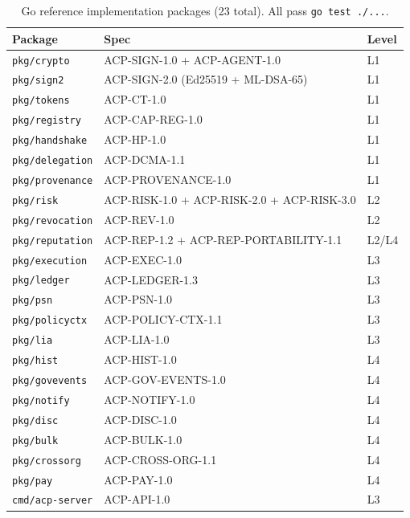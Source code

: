 \documentclass[11pt]{article}
\theoremstyle{definition}
\begin{document}
\begin{table}[h!]
\centering
\small
\begin{tabular}{@{}lll@{}}
\toprule
\textbf{Package} & \textbf{Spec} & \textbf{Level} \\
\midrule
\texttt{pkg/crypto} & ACP-SIGN-1.0 + ACP-AGENT-1.0 & L1 \\
\texttt{pkg/sign2} & ACP-SIGN-2.0 (Ed25519 + ML-DSA-65) & L1 \\
\texttt{pkg/tokens} & ACP-CT-1.0 & L1 \\
\texttt{pkg/registry} & ACP-CAP-REG-1.0 & L1 \\
\texttt{pkg/handshake} & ACP-HP-1.0 & L1 \\
\texttt{pkg/delegation} & ACP-DCMA-1.1 & L1 \\
\texttt{pkg/provenance} & ACP-PROVENANCE-1.0 & L1 \\
\texttt{pkg/risk} & ACP-RISK-1.0 + ACP-RISK-2.0 + ACP-RISK-3.0 & L2 \\
\texttt{pkg/revocation} & ACP-REV-1.0 & L2 \\
\texttt{pkg/reputation} & ACP-REP-1.2 + ACP-REP-PORTABILITY-1.1 & L2/L4 \\
\texttt{pkg/execution} & ACP-EXEC-1.0 & L3 \\
\texttt{pkg/ledger} & ACP-LEDGER-1.3 & L3 \\
\texttt{pkg/psn} & ACP-PSN-1.0 & L3 \\
\texttt{pkg/policyctx} & ACP-POLICY-CTX-1.1 & L3 \\
\texttt{pkg/lia} & ACP-LIA-1.0 & L3 \\
\texttt{pkg/hist} & ACP-HIST-1.0 & L4 \\
\texttt{pkg/govevents} & ACP-GOV-EVENTS-1.0 & L4 \\
\texttt{pkg/notify} & ACP-NOTIFY-1.0 & L4 \\
\texttt{pkg/disc} & ACP-DISC-1.0 & L4 \\
\texttt{pkg/bulk} & ACP-BULK-1.0 & L4 \\
\texttt{pkg/crossorg} & ACP-CROSS-ORG-1.1 & L4 \\
\texttt{pkg/pay} & ACP-PAY-1.0 & L4 \\
\texttt{cmd/acp-server} & ACP-API-1.0 & L3 \\
\bottomrule
\end{tabular}
\caption{Go reference implementation packages (23 total). All pass \texttt{go test ./...}.}
\end{table}
\end{document}

